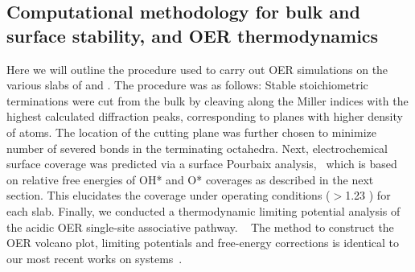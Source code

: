 \subsection{Computational methodology for bulk and surface stability, and OER thermodynamics}
%
%
Here we will outline the procedure used to carry out OER simulations on the various slabs of \IrOtwo and \IrOthree.
%
The procedure was as follows:
%
Stable stoichiometric terminations were cut from the bulk by cleaving along the Miller indices with the highest calculated diffraction peaks, corresponding to planes with higher density of atoms.
%
The location of the cutting plane was further chosen to minimize number of severed bonds in the terminating octahedra.
%
Next, electrochemical surface coverage was predicted via a surface Pourbaix analysis,~\cite{Lu2017}
which is based on relative free energies of OH* and O* coverages as described in the next section.
%
This elucidates the coverage under operating conditions ($>$\num{1.23} \VRHE) for each slab.
%
Finally, we conducted a thermodynamic limiting potential analysis of the acidic OER single-site associative pathway.
~\cite{Rossmeisl2007,Man2011,Friebel2015,Seitz2016,Strickler2019}
%
The method to construct the OER volcano plot, limiting potentials and free-energy corrections is identical to our most recent works on \IrOtwo systems~\cite{Strickler2019,Lee2020}.



